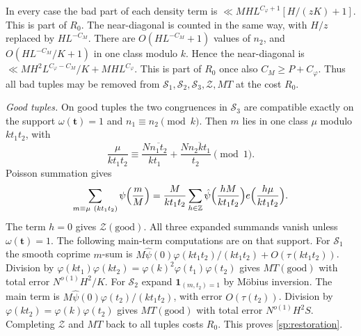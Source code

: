 In every case the bad part of each density term is
$\ll MHL^{C_\varphi+1}[H/(zK)+1]$. This is part of $R_0$. The near-diagonal is
counted in the same way, with $H/z$ replaced by $HL^{-C_M}$. There are
$O(HL^{-C_M}+1)$ values of $n_2$, and $O(HL^{-C_M}/K+1)$ in one class
modulo $k$. Hence the near-diagonal is $\ll MH^2L^{C_\varphi-C_M}/K+MHL^{C_\varphi}$. This is part of $R_0$ once also
$C_M\ge P+C_\varphi$. Thus all bad tuples may be removed from
$\mathcal S_1,\mathcal S_2,\mathcal S_3,\mathcal Z,MT$ at the cost $R_0$.

\emph{Good tuples.} On good tuples the two congruences in $\mathcal S_3$ are
compatible exactly on the support $\omega(\mathbf t)=1$ and
$n_1\equiv n_2\pmod k$. Then $m$ lies in one
class $\mu$ modulo $kt_1t_2$, with
\begin{equation}\label{sp:mu}
 \frac\mu{kt_1t_2}\equiv\frac{N\overline{n_1t_2}}{kt_1}+\frac{N\overline{n_2kt_1}}{t_2}\pmod1 .
\end{equation}
Poisson summation gives
\begin{equation}\label{sp:poisson-m}
 \sum_{m\equiv\mu\ (kt_1t_2)}\psi\Bigl(\frac mM\Bigr)
 =\frac M{kt_1t_2}\sum_{h\in\mathbb Z}\hat\psi\Bigl(\frac{hM}{kt_1t_2}\Bigr)
  e\Bigl(\frac{h\mu}{kt_1t_2}\Bigr).
\end{equation}
The term $h=0$ gives $\mathcal Z(\mathrm{good})$. All three expanded
summands vanish unless $\omega(\mathbf t)=1$. The following main-term
computations are on that support. For $\mathcal S_1$ the smooth
coprime $m$-sum is $M\hat\psi(0)\varphi(kt_1t_2)/(kt_1t_2)+O(\tau(kt_1t_2))$.
Division by $\varphi(kt_1)\varphi(kt_2)=\varphi(k)^2\varphi(t_1)\varphi(t_2)$
gives $MT(\mathrm{good})$ with total error $N^{o(1)}H^2/K$. For $\mathcal S_2$
expand $\mathbf1_{(m,t_2)=1}$ by M\"obius inversion. The main term is
$M\hat\psi(0)\varphi(t_2)/(kt_1t_2)$, with error $O(\tau(t_2))$.
Division by $\varphi(kt_2)=\varphi(k)\varphi(t_2)$ gives $MT(\mathrm{good})$
with total error $N^{o(1)}H^2S$. Completing $\mathcal Z$ and $MT$ back to all
tuples costs $R_0$. This proves \eqref{sp:restoration}.

